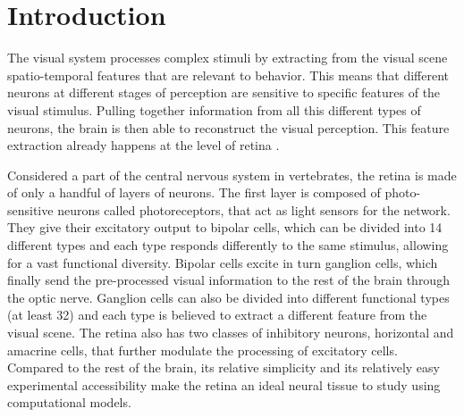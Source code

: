 \section{Introduction}
\label{sec:introduction}

The visual system processes complex stimuli by extracting from the visual scene spatio-temporal features that are relevant to behavior. This means that different neurons at different stages of perception are sensitive to specific features of the visual stimulus. Pulling together information from all this different types of neurons, the brain is then able to reconstruct the visual perception. This feature extraction already happens at the level of retina \citep{gollisch_eye_2010}. %

Considered a part of the central nervous system in vertebrates, the retina is made of only a handful of layers of neurons. The first layer is composed of photo-sensitive neurons called photoreceptors, that act as light sensors for the network. They give their excitatory output to bipolar cells, which can be divided into 14 different types and each type responds differently to the same stimulus, allowing for a vast functional diversity. Bipolar cells excite in turn ganglion cells, which finally send the pre-processed visual information to the rest of the brain through the optic nerve. Ganglion cells can also be divided into different functional types (at least 32) and each type is believed to extract a different feature from the visual scene. The retina also has two classes of inhibitory neurons, horizontal and amacrine cells, that further modulate the processing of excitatory cells. Compared to the rest of the brain, its relative simplicity and its relatively easy experimental accessibility make the retina an ideal neural tissue to study using computational models. \newline


